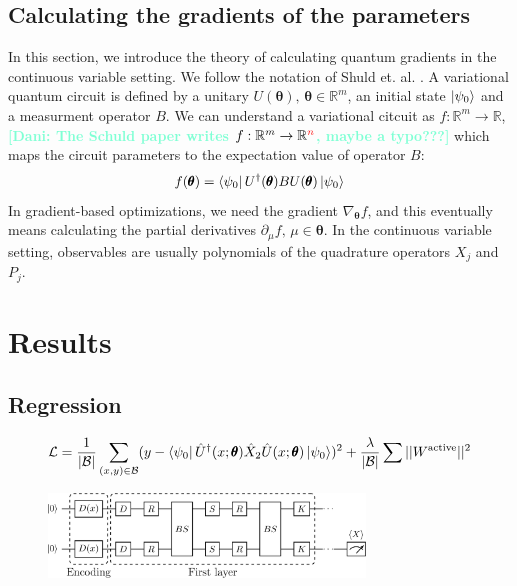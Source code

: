 \documentclass[12pt, a4paper,  nobibnotes]{article}
\newcommand{\red}[1]{\textcolor{red}{#1}}
\newcommand{\op}[1]{\hat{#1}}
\newcommand{\nd}[1]{\textcolor{Aquamarine}{\textbf{[Dani: #1]}}}
\begin{document}
\subsection{Calculating the gradients of the parameters}
\label{sec:qgrad}
In this section, we introduce the theory of calculating quantum gradients in the continuous variable setting. 
We follow the notation of Shuld et. al. \cite{AnalyticGradientsSchuld}. A variational quantum circuit is 
defined by a unitary $U(\pmb\theta),\, \pmb\theta\in\mathbb{R}^m$, an initial state $\ket{\psi_0}$ and a measurment 
operator $B$. We can understand a variational citcuit as $f:\mathbb{R}^m \rightarrow \mathbb{R}$, \nd{The Schuld paper writes $f:\mathbb{R}^m \rightarrow \mathbb{R}^{\red n}$, maybe a typo???} 
which maps the circuit parameters to the expectation value of operator $B$:
\begin{equation}
    f(\pmb\theta) = \bra{\psi_0}U^{\dagger}(\pmb\theta) B U(\pmb\theta)\ket{\psi_0}   
\end{equation}
In gradient-based optimizations, we need the gradient $\nabla_{\pmb\theta} f$, and this eventually means calculating the partial derivatives
$\partial_{\mu}f,\,\mu\in\pmb\theta$. In the continuous variable setting, observables are usually polynomials of the quadrature operators $X_j$ and $P_j$.



\section{Results}
\subsection{Regression}

\begin{equation}
    \mathcal L = \frac{1}{|\mathcal B|}\sum\limits_{(x,y)\in\mathcal B}({y - \bra{\psi_0}\op U^{\dagger}(x;\pmb\theta)\op X_2 \op U(x;\pmb\theta)\ket{\psi_0}})^2 + \frac{\lambda}{|\mathcal B|}\sum||W^{\textrm{active}}||^2 
\end{equation}

\begin{figure}[H]
    \centering
    \includegraphics[width=0.75\textwidth]{figures/BasicTwoModeRegressor-circuit.pdf}
    \caption{}
    \label{fig:single_layer_regression}
\end{figure}
\end{document}
